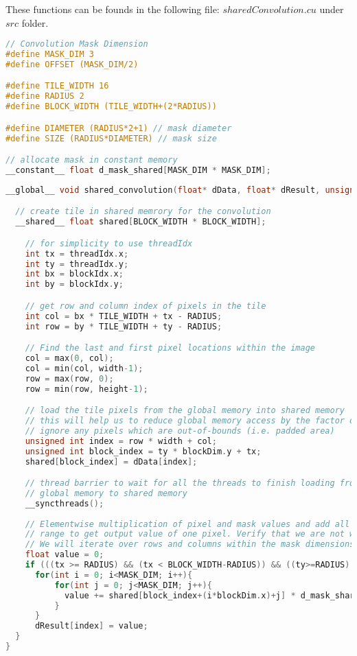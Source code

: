 These functions can be founds in the following file: $sharedConvolution.cu$ under $src$ folder.
\begin{lstlisting}[language=C, label={lst: mask_shared}, caption= Cache mask in to the constant memory]
// Convolution Mask Dimension
#define MASK_DIM 3
#define OFFSET (MASK_DIM/2)

#define TILE_WIDTH 16
#define RADIUS 2
#define BLOCK_WIDTH (TILE_WIDTH+(2*RADIUS))

#define DIAMETER (RADIUS*2+1) // mask diameter
#define SIZE (RADIUS*DIAMETER) // mask size

// allocate mask in constant memory
__constant__ float d_mask_shared[MASK_DIM * MASK_DIM];
\end{lstlisting}


\begin{lstlisting}[language=C, label={lst: shared_convolution}, caption= 2D Convolution using the shared memory]
__global__ void shared_convolution(float* dData, float* dResult, unsigned int width, unsigned int height){

  // create tile in shared memrory for the convolution
  __shared__ float shared[BLOCK_WIDTH * BLOCK_WIDTH];

    // for simplicity to use threadIdx
    int tx = threadIdx.x;
    int ty = threadIdx.y;
    int bx = blockIdx.x;
    int by = blockIdx.y;

    // get row and column index of pixels in the tile
    int col = bx * TILE_WIDTH + tx - RADIUS;
    int row = by * TILE_WIDTH + ty - RADIUS;

    // Find the last and first pixel locations within the image
    col = max(0, col);
    col = min(col, width-1);
    row = max(row, 0);
    row = min(row, height-1);

    // load the tile pixels from the global memory into shared memory
    // this will help us to reduce global memory access by the factor of 1/TILE_WIDTH
    // ignore any pixels which are out-of-bounds (i.e. padded area)
    unsigned int index = row * width + col;
    unsigned int block_index = ty * blockDim.y + tx;
    shared[block_index] = dData[index];

    // thread barrier to wait for all the threads to finish loading from
    // global memory to shared memory
    __syncthreads();
  
    // Elementwise multiplication of pixel and mask values and add all of the values within the mask
    // range to get output value of one pixel. Verify that we are not working out-of-bounds of the image
    // We will iterate over rows and columns within the mask dimensions (i.e. all the neighbours)
    float value = 0;
    if (((tx >= RADIUS) && (tx < BLOCK_WIDTH-RADIUS)) && ((ty>=RADIUS) && (ty<=BLOCK_WIDTH-RADIUS))){
      for(int i = 0; i<MASK_DIM; i++){
          for(int j = 0; j<MASK_DIM; j++){ 
            value += shared[block_index+(i*blockDim.x)+j] * d_mask_shared[i*3+j];
          }
      }
      dResult[index] = value;
  }
}\end{lstlisting}

